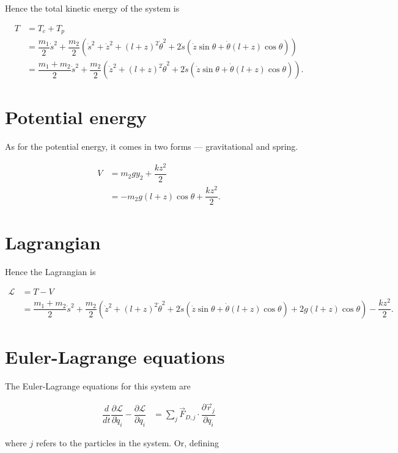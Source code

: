 \documentclass[12pt,a4paper,portrait]{article}
\newcommand{\lag}{\mathcal{L}}
\begin{document}
	Hence the total kinetic energy of the system is
	
	\begin{align*}
		T &= T_c + T_p \\
		&= \dfrac{m_1}{2}\dot{s}^2 + \dfrac{m_2}{2} \left(\dot{s}^2 + \dot{z}^2 + (l+z)^2\dot{\theta}^2 + 2\dot{s}(\dot{z}\sin{\theta} + \dot{\theta}(l+z)\cos{\theta})\right) \\
		&= \dfrac{m_1+m_2}{2} \dot{s}^2 + \dfrac{m_2}{2}\left(\dot{z}^2 + (l+z)^2\dot{\theta}^2 + 2\dot{s}(\dot{z}\sin{\theta} + \dot{\theta}(l+z)\cos{\theta})\right).
	\end{align*}
	
	\section{Potential energy}
	As for the potential energy, it comes in two forms --- gravitational and spring. 
	
	\begin{align*}
		V &= m_2 g y_2 + \dfrac{kz^2}{2}\\
		&= -m_2g(l+z)\cos{\theta} + \dfrac{kz^2}{2}.
	\end{align*}
	
	\section{Lagrangian}
	Hence the Lagrangian is
	
	\begin{align*}
		\lag &= T - V \\
		&= \dfrac{m_1+m_2}{2} \dot{s}^2 + \dfrac{m_2}{2}\left(\dot{z}^2 + (l+z)^2\dot{\theta}^2 + 2\dot{s}(\dot{z}\sin{\theta} + \dot{\theta}(l+z)\cos{\theta})+2g(l+z)\cos{\theta}\right) - \dfrac{kz^2}{2}.
	\end{align*}
	
	\section{Euler-Lagrange equations}
	The Euler-Lagrange equations for this system are
	
	\begin{align*}
		\dfrac{d}{dt}\dfrac{\partial \lag}{\partial \dot{q}_i} - \dfrac{\partial \lag}{\partial q_i} &= \sum_{j} \vec{F}_{D, j} \cdot \dfrac{\partial \vec{r}_{j}}{\partial q_i}
	\end{align*}
	
	where $j$ refers to the particles in the system. Or, defining
	
\end{document}
